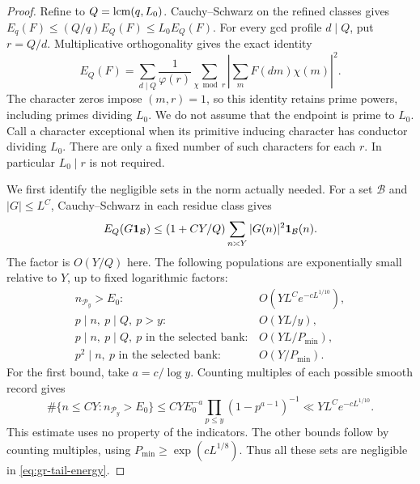 \begin{proof}
Refine to \(Q=\operatorname{lcm}(q,L_0)\).
Cauchy--Schwarz on the refined classes gives
\(E_q(F)\le(Q/q)E_Q(F)\le L_0E_Q(F)\).
For every gcd profile \(d\mid Q\), put \(r=Q/d\).
Multiplicative orthogonality gives the exact identity
\begin{equation}
 E_Q(F)=\sum_{d\mid Q}\frac1{\varphi(r)}
       \sum_{\chi\bmod r}\left|\sum_m F(dm)\chi(m)\right|^2.
 \label{eq:gr-gcdidentity}
\end{equation}
The character zeros impose \((m,r)=1\), so this identity retains
prime powers, including primes dividing \(L_0\). We do not assume
that the endpoint is prime to \(L_0\). Call a character exceptional
when its primitive inducing character has conductor dividing \(L_0\).
There are only a fixed number of such characters for each \(r\).
In particular \(L_0\mid r\) is not required.

We first identify the negligible sets in the norm actually needed.
For a set \(\mathcal B\) and \(|G|\le L^C\), Cauchy--Schwarz in each
residue class gives
\begin{equation}
 E_Q(G\mathbf 1_{\mathcal B})
 \le(1+CY/Q)\sum_{n\asymp Y}|G(n)|^2\mathbf 1_{\mathcal B}(n).
 \label{eq:gr-tail-energy}
\end{equation}
The factor is \(O(Y/Q)\) here.
The following populations are exponentially small relative to \(Y\),
up to fixed logarithmic factors:
\begin{equation}
 \begin{array}{ll}
 n_{\mathcal P_y}>E_0:& O(YL^C e^{-cL^{1/10}}),\\
 p\mid n,\ p\mid Q,\ p>y:& O(YL/y),\\
 p\mid n,\ p\mid Q,\ p\text{ in the selected bank}:&
                  O(YL/P_{\min}),\\
 p^2\mid n,\ p\text{ in the selected bank}:&
                  O(Y/P_{\min}).
 \end{array}                                                       \label{eq:gr-tailsets}
\end{equation}
For the first bound, take \(a=c/\log y\). Counting multiples of
each possible smooth record gives
\[
 \#\{n\le CY:n_{\mathcal P_y}>E_0\}
 \le CY E_0^{-a}\prod_{p\le y}(1-p^{a-1})^{-1}
                 \ll YL^C e^{-cL^{1/10}}.
\]
This estimate uses no property of the indicators. The other bounds
follow by counting multiples,
using \(P_{\min}\ge\exp(cL^{1/8})\).
Thus all these sets are negligible in \eqref{eq:gr-tail-energy}.


\end{proof}
